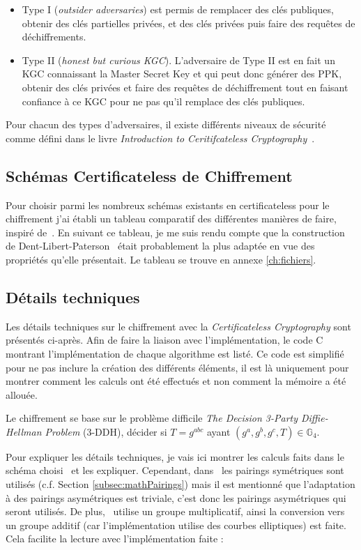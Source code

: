 \begin{itemize}
	\item Type I (\textit{outsider adversaries}) est permis de remplacer des clés publiques, obtenir des clés partielles privées, et des clés privées puis faire des requêtes de déchiffrements.
	\item Type II (\textit{honest but curious KGC}). L'adversaire de Type II est en fait un KGC connaissant la Master Secret Key et qui peut donc générer des PPK, obtenir des clés privées et faire des requêtes de déchiffrement tout en faisant confiance à ce KGC pour ne pas qu'il remplace des clés publiques.
\end{itemize}

Pour chacun des types d'adversaires, il existe différents niveaux de sécurité comme défini dans le livre \textit{Introduction to Ceritifcateless Cryptography}~\cite{bookIntroCertificateless}.
\subsection{Schémas Certificateless de Chiffrement}
Pour choisir parmi les nombreux schémas existants en certificateless pour le chiffrement j'ai établi un tableau comparatif des différentes manières de faire, inspiré de~\cite{bookIntroCertificateless}. En suivant ce tableau, je me suis rendu compte que la construction de Dent-Libert-Paterson~\cite{conf/pkc/DentLP08} était probablement la plus adaptée en vue des propriétés qu'elle présentait. Le tableau se trouve en annexe \ref{ch:fichiers}.

\subsection{Détails techniques}
Les détails techniques sur le chiffrement avec la \textit{Certificateless Cryptography} sont présentés ci-après. Afin de faire la liaison avec l'implémentation, le code C montrant l'implémentation de chaque algorithme est listé. Ce code est simplifié pour ne pas inclure la création des différents éléments, il est là uniquement pour montrer comment les calculs ont été effectués et non comment la mémoire a été allouée.

Le chiffrement se base sur le problème difficile \textit{The Decision 3-Party Diffie-Hellman Problem} (3-DDH), décider si $T =g^{abc}$ ayant $(g^a, g^b, g^c, T) \in \mathbb{G}_4$.

Pour expliquer les détails techniques, je vais ici montrer les calculs faits dans le schéma choisi~\cite{conf/pkc/DentLP08} et les expliquer. Cependant, dans~\cite{conf/pkc/DentLP08} les pairings symétriques sont utilisés (c.f. Section \ref{subsec:mathPairings}) mais il est mentionné que l'adaptation à des pairings asymétriques est triviale, c'est donc les pairings asymétriques qui seront utilisés. De plus,~\cite{conf/pkc/DentLP08} utilise un groupe multiplicatif, ainsi la conversion vers un groupe additif (car l'implémentation utilise des courbes elliptiques) est faite. Cela facilite la lecture avec l'implémentation faite :

